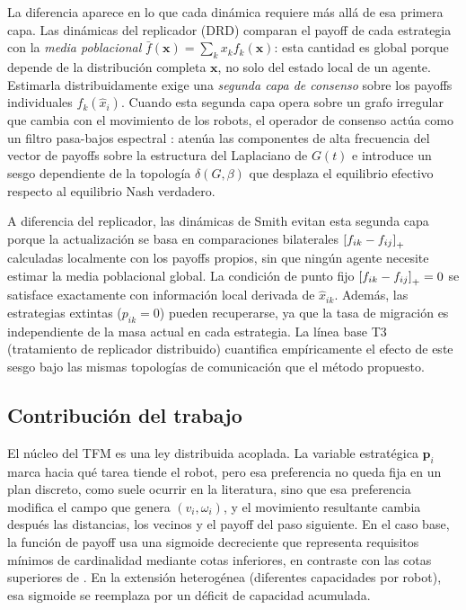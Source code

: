 La diferencia aparece en lo que cada dinámica requiere más allá de esa primera capa.
Las dinámicas del replicador (DRD) comparan el payoff de cada estrategia con la
\emph{media poblacional} $\bar{f}(\mathbf{x}) = \sum_k x_k f_k(\mathbf{x})$:
esta cantidad es global porque depende de la distribución completa $\mathbf{x}$,
no solo del estado local de un agente. Estimarla distribuida\-mente exige una
\emph{segunda capa de consenso} sobre los payoffs individuales $f_k(\hat{x}_i)$.
Cuando esta segunda capa opera sobre un grafo irregular que cambia con el movimiento
de los robots, el operador de consenso actúa como un filtro pasa-bajos espectral
\citep{sandryhaila2013dsp}: atenúa las componentes de alta frecuencia del vector
de payoffs sobre la estructura del Laplaciano de $G(t)$ e introduce un sesgo
dependiente de la topología $\delta(G, \beta)$ que desplaza el equilibrio efectivo
respecto al equilibrio Nash verdadero.

A diferencia del replicador, las dinámicas de Smith evitan esta segunda capa porque la
actualización se basa en comparaciones bilaterales $\left[f_{ik} - f_{ij}\right]_{+}$ calculadas
localmente con los payoffs propios, sin que ningún agente necesite estimar la media poblacional
global. La
condición de punto fijo $\left[f_{ik} - f_{ij}\right]_{+} = 0$ se satisface exactamente con
información local derivada de $\hat{x}_{ik}$. Además, las estrategias extintas
($p_{ik} = 0$) pueden recuperarse, ya que la tasa de migración es independiente
de la masa actual en cada estrategia. La línea base T3 (tratamiento de replicador
distribuido) cuantifica empíricamente el efecto de este sesgo bajo las mismas
topologías de comunicación que el método propuesto.

\subsection{Contribución del trabajo}

El núcleo del TFM es una ley distribuida acoplada. La variable estratégica
$\mathbf{p}_i$ marca hacia qué tarea tiende el robot, pero esa preferencia no queda fija
en un plan discreto, como suele ocurrir en la literatura, sino que esa preferencia modifica el campo que genera $(v_i,\omega_i)$, y el movimiento
resultante cambia después las distancias, los vecinos y el payoff del paso siguiente. En
el caso base, la función de payoff usa una sigmoide decreciente que representa requisitos mínimos
de cardinalidad mediante cotas inferiores, en contraste con las cotas superiores de
\citet{martinezpiazuelo2022automatica}. En la extensión heterogénea (diferentes capacidades por robot), esa sigmoide se
reemplaza por un déficit de capacidad acumulada.

